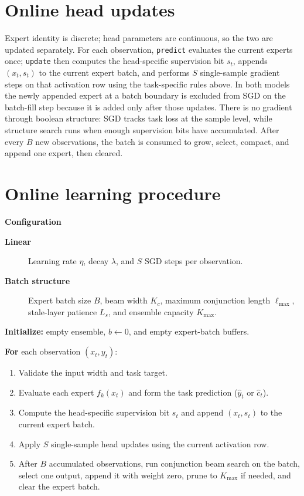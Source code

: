 \documentclass[11pt]{article}
\begin{document}
\section{Online head updates}
Expert identity is discrete; head parameters are continuous, so the two are
updated separately.  For each observation, \texttt{predict} evaluates the
current experts once; \texttt{update} then computes the head-specific
supervision bit $s_t$, appends $(x_t,s_t)$ to the current expert batch, and
performs $S$ single-sample gradient steps on that activation row using the
task-specific rules above.  In both models the newly appended expert at a
batch boundary is excluded from SGD on the batch-fill step because it is added
only after those updates.  There is no gradient through boolean structure: SGD
tracks task loss at the sample level, while structure search runs when enough
supervision bits have accumulated.  After every $B$ new observations, the
batch is consumed to grow, select, compact, and append one expert, then
cleared.

\section{Online learning procedure}
\noindent\textbf{Configuration}
\begin{description}
  \item[\textbf{Linear}] Learning rate $\eta$, decay $\lambda$, and $S$ SGD
  steps per observation.
  \item[\textbf{Batch structure}] Expert batch size $B$, beam width $K_c$,
  maximum conjunction length $\ell_{\max}$, stale-layer patience $L_s$, and
  ensemble capacity $K_{\max}$.
\end{description}

\noindent\textbf{Initialize:} empty ensemble, $b\leftarrow 0$, and empty
expert-batch buffers.

\noindent\textbf{For} each observation $(x_t,y_t)$:
\begin{enumerate}
  \item Validate the input width and task target.
  \item Evaluate each expert $f_k(x_t)$ and form the task prediction
  ($\hat y_t$ or $\hat c_t$).
  \item Compute the head-specific supervision bit $s_t$ and append
  $(x_t,s_t)$ to the current expert batch.
  \item Apply $S$ single-sample head updates using the current activation row.
  \item After $B$ accumulated observations, run conjunction beam search on the
  batch, select one output, append it with weight zero, prune to $K_{\max}$ if
  needed, and clear the expert batch.
\end{enumerate}
\end{document}
